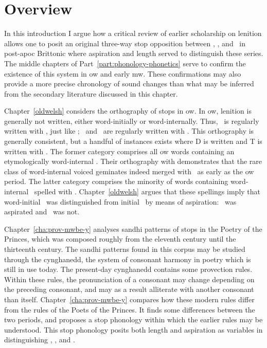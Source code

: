 \section{Overview}
\label{sec:overview-1}

In this introduction I argue how a critical review of earlier scholarship on lenition allows one to posit an original three-way stop opposition between \xT, \xD, and \lT\ in post-\gls{apoc} Brittonic where aspiration and length served to distinguish these series. The middle chapters of Part~\ref{part:phonology-phonetics} serve to confirm the existence of this system in \gls{ow} and early \gls{mw}. These confirmations may also provide a more precise chronology of sound changes than what may be inferred from the secondary literature discussed in this chapter.

Chapter~\ref{oldwelsh} considers the orthography of stops in \gls{ow}. In \gls{ow}, lenition is generally not written, either word-initially or word-internally. Thus, \lT\ is regularly written with , just like \xT; \lD\ and \xD\ are regularly written with . This orthography is generally consistent, but a handful of instances exists where \gls{D} is written  and \gls{T} is written with . The former category comprises all \gls{ow} words containing an etymologically word-internal \xD. Their orthography with  demonstrates that the rare class of word-internal voiced geminates indeed merged with \lT\ as early as the \gls{ow} period. The latter category comprises the minority of words containing word-internal \lT\ spelled with . Chapter~\ref{oldwelsh} argues that these spellings imply that word-initial \lT\ was distinguished from initial \xD\ by means of aspiration: \lT\ was aspirated and \xD\ was not.

Chapter~\ref{cha:prov-mwbe-y} analyses sandhi patterns of stops in the Poetry of the Princes, which was composed roughly from the eleventh century until the thirteenth century. The sandhi patterns found in this corpus  may be studied through the cynghanedd, the system of consonant harmony in poetry which is still in use today. The present-day cynghanedd  contains some provection rules. Within these rules, the pronunciation of a consonant may change depending on the preceding consonant, and may as a result alliterate with another consonant than itself. Chapter~\ref{cha:prov-mwbe-y} compares how these modern rules differ from the rules of the Poets of the Princes. It finds some differences between the two periods, and proposes a stop phonology within which the earlier rules may be understood. This stop phonology posits both length and aspiration as variables in distinguishing \xT, \lT, and \xD.

